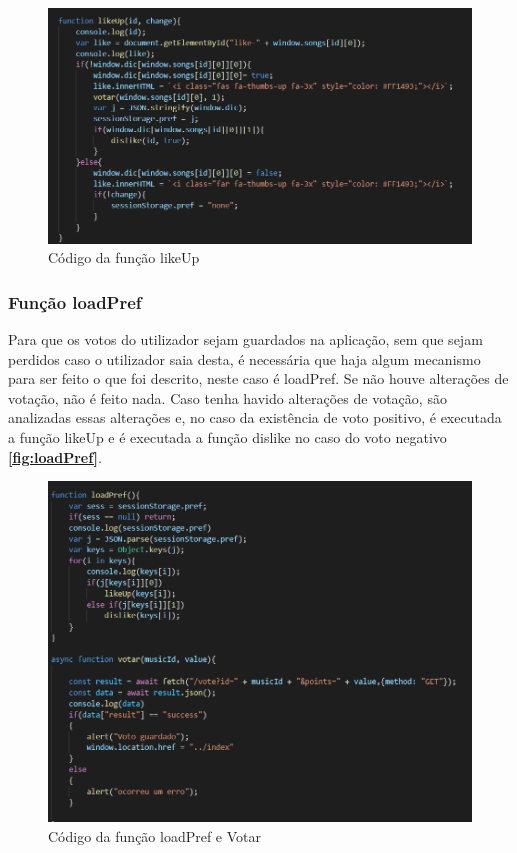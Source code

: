 \documentclass{report}
\begin{document}
\begin{figure}[!h]
\center 
\includegraphics[width=330pt]{img/Funcao_likeUp.png}
\caption{Código da função likeUp}
\label{fig:likeUp}
\end{figure}

\subsubsection{Função loadPref}
\label{ssec:loadPref}
\hspace{5pt}Para que os votos do utilizador sejam guardados na aplicação, sem que sejam perdidos caso o 
utilizador saia desta, é necessária que haja algum mecanismo para ser feito o que foi descrito, neste 
caso é loadPref. Se não houve alterações de votação, não é feito nada. Caso tenha havido alterações de 
votação, são analizadas essas alterações e, no caso da existência de voto positivo, é executada a função 
likeUp e é executada a função dislike no caso do voto negativo \textbf{\autoref{fig:loadPref}}.

\begin{figure}[!h]
\center 
\includegraphics[width=330pt]{img/loadPrefVotar.png}
\caption{Código da função loadPref e Votar}
\label{fig:loadPref}
\end{figure}
\end{document}
